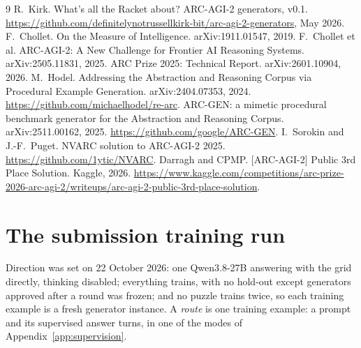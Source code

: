 \documentclass[11pt]{article}
\begin{document}
\begin{thebibliography}{9}
 R.~Kirk. What's all the Racket about? ARC-AGI-2 generators, v0.1. \url{https://github.com/definitelynotrussellkirk-bit/arc-agi-2-generators}, May 2026.
 F.~Chollet. On the Measure of Intelligence. arXiv:1911.01547, 2019.
 F.~Chollet et al. ARC-AGI-2: A New Challenge for Frontier AI Reasoning Systems. arXiv:2505.11831, 2025.
 ARC Prize 2025: Technical Report. arXiv:2601.10904, 2026.
 M.~Hodel. Addressing the Abstraction and Reasoning Corpus via Procedural Example Generation. arXiv:2404.07353, 2024. \url{https://github.com/michaelhodel/re-arc}.
 ARC-GEN: a mimetic procedural benchmark generator for the Abstraction and Reasoning Corpus. arXiv:2511.00162, 2025. \url{https://github.com/google/ARC-GEN}.
 I.~Sorokin and J.-F.~Puget. NVARC solution to ARC-AGI-2 2025. \url{https://github.com/1ytic/NVARC}.
 Darragh and CPMP. [ARC-AGI-2] Public 3rd Place Solution. Kaggle, 2026. \url{https://www.kaggle.com/competitions/arc-prize-2026-arc-agi-2/writeups/arc-agi-2-public-3rd-place-solution}.
\end{thebibliography}


\appendix

\section{The submission training run}
\label{app:run}

Direction was set on 22 October 2026: one Qwen3.8-27B answering with the grid
directly, thinking disabled; everything trains, with no hold-out except
generators approved after a round was frozen; and no puzzle trains twice, so
each training example is a fresh generator instance. A \emph{route} is one training example: a prompt
and its supervised answer turns, in one of the modes of
Appendix~\ref{app:supervision}.
\end{document}

